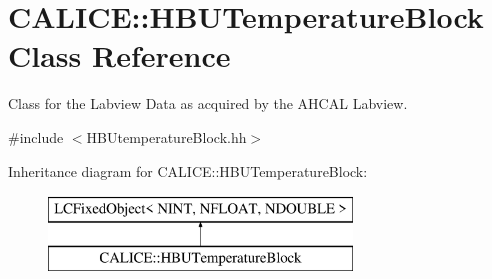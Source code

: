 \section{C\-A\-L\-I\-C\-E\-:\-:H\-B\-U\-Temperature\-Block Class Reference}
\label{classCALICE_1_1HBUTemperatureBlock}


Class for the Labview Data as acquired by the A\-H\-C\-A\-L Labview.  




{\ttfamily \#include $<$H\-B\-Utemperature\-Block.\-hh$>$}

Inheritance diagram for C\-A\-L\-I\-C\-E\-:\-:H\-B\-U\-Temperature\-Block\-:\begin{figure}[H]
\begin{center}
\leavevmode
\includegraphics[height=2.000000cm]{classCALICE_1_1HBUTemperatureBlock}
\end{center}
\end{figure}
